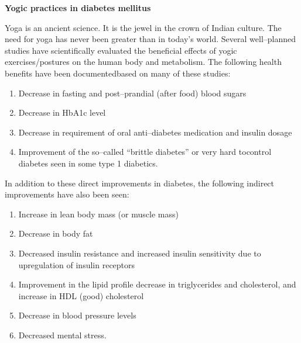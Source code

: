 \noindent\textbf{Yogic practices in diabetes mellitus}

Yoga is an ancient science. It is the jewel in the crown of Indian culture. The need for yoga has never been greater than in today’s world. Several well–planned studies have scientifically evaluated the beneficial effects of yogic exercises/postures on the human body and metabolism. The following health benefits have been documented\break based on many of these studies:

\vspace{-\topsep}
\begin{enumerate}[•]
\itemsep=0pt
\item Decrease in fasting and post–prandial (after food) blood sugars
\item Decrease in HbA1c level
\item Decrease in requirement of oral anti–diabetes medication and insulin dosage
\item Improvement of the so–called “brittle diabetes” or very hard to\break control diabetes seen in some type 1 diabetics.
\end{enumerate}
\vspace{-\topsep}

In addition to these direct improvements in diabetes, the following indirect improvements have also been seen:

\vspace{-\topsep}
\begin{enumerate}[•]
\itemsep=0pt
\item Increase in lean body mass (or muscle mass)
\item Decrease in body fat
\item Decreased insulin resistance and increased insulin sensitivity due to upregulation of insulin receptors
\item Improvement in the lipid profile decrease in triglycerides and chole\-sterol, and increase in HDL (good) cholesterol
\item Decrease in blood pressure levels
\item Decreased mental stress.
\end{enumerate}
\vspace{-\topsep}

